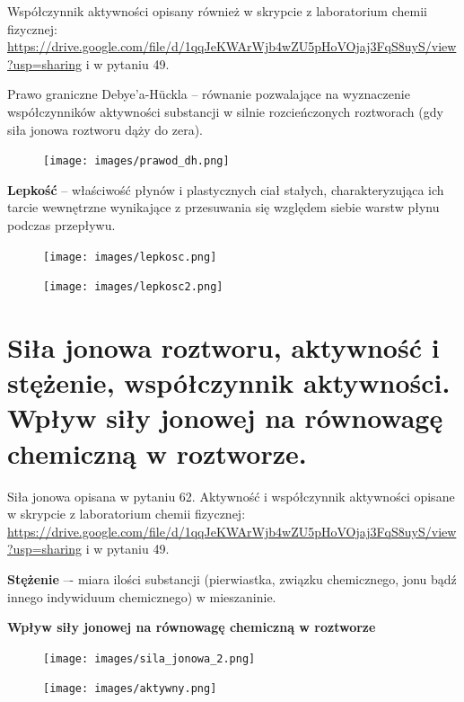 \documentclass{article}
\begin{document}
Współczynnik aktywności opisany również w skrypcie z laboratorium chemii fizycznej: \url{https://drive.google.com/file/d/1qqJeKWArWjb4wZU5pHoVOjaj3FqS8uyS/view?usp=sharing} i w pytaniu 49.

Prawo graniczne Debye'a-H{\"u}ckla -- równanie pozwalające na wyznaczenie współczynników aktywności substancji w silnie rozcieńczonych roztworach (gdy siła jonowa roztworu dąży do zera).

\begin{figure}[H]
    \centering
    \texttt{[image: images/prawod\_dh.png]}
\end{figure}

\textbf{Lepkość} -- właściwość płynów i plastycznych ciał stałych, charakteryzująca ich tarcie wewnętrzne wynikające z przesuwania się względem siebie warstw płynu podczas przepływu.
\begin{figure}[H]
    \centering
    \texttt{[image: images/lepkosc.png]}
\end{figure}

\begin{figure}[H]
    \centering
    \texttt{[image: images/lepkosc2.png]}
\end{figure}

\section{Siła jonowa roztworu, aktywność i stężenie, współczynnik aktywności. Wpływ siły jonowej na równowagę chemiczną w roztworze.}

Siła jonowa opisana w pytaniu 62. Aktywność i współczynnik aktywności opisane w skrypcie z laboratorium chemii fizycznej: \url{https://drive.google.com/file/d/1qqJeKWArWjb4wZU5pHoVOjaj3FqS8uyS/view?usp=sharing} i w pytaniu 49. 

\textbf{Stężenie} –- miara ilości substancji (pierwiastka, związku chemicznego, jonu bądź innego indywiduum chemicznego) w mieszaninie. 

\begin{center}
    \textbf{Wpływ siły jonowej na równowagę chemiczną w roztworze}
\end{center}

\begin{figure}[H]
    \centering
    \texttt{[image: images/sila\_jonowa\_2.png]}
\end{figure}

\begin{figure}[H]
    \centering
    \texttt{[image: images/aktywny.png]}
\end{figure}
\end{document}
